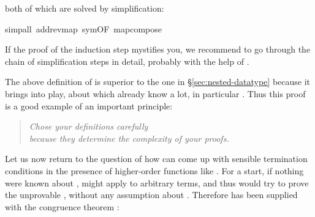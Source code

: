 \begin{isabellebody}
\begin{isamarkuptxt}
\begin{quote}
\end{quote}
both of which are solved by simplification:%
\end{isamarkuptxt}%
simp{\isacharunderscore}all\ add{\isacharcolon}rev{\isacharunderscore}map\ sym{\isacharbrackleft}OF\ map{\isacharunderscore}compose{\isacharbrackright}{\isacharparenright}%
\begin{isamarkuptext}%
\noindent
If the proof of the induction step mystifies you, we recommend to go through
the chain of simplification steps in detail, probably with the help of
.

The above definition of  is superior to the one in \S\ref{sec:nested-datatype}
because it brings  into play, about which already know a lot, in particular
.
Thus this proof is a good example of an important principle:
\begin{quote}
\emph{Chose your definitions carefully\\
because they determine the complexity of your proofs.}
\end{quote}

Let us now return to the question of how  can come up with
sensible termination conditions in the presence of higher-order functions
like . For a start, if nothing were known about ,
 might apply  to arbitrary terms, and thus
 would try to prove the unprovable , without any assumption about .  Therefore
 has been supplied with the congruence theorem
:
\begin{quote}


\end{quote}
\end{isamarkuptext}
\end{isabellebody}
